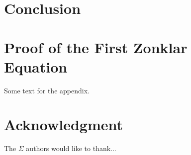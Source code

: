 \documentclass[journal]{IEEEtran}
\begin{document}
\section{Conclusion}
\blindtext






%


\appendices
\section{Proof of the First Zonklar Equation}
Some text for the appendix.

\section*{Acknowledgment}


The $\Sigma$ authors would like to thank...


\ifCLASSOPTIONcaptionsoff
  \newpage
\fi



\end{document}
